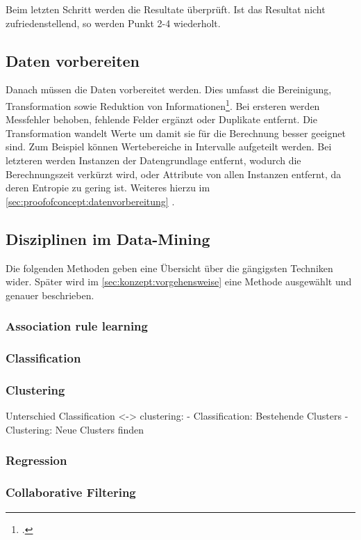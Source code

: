 Beim letzten Schritt werden die Resultate überprüft. Ist das Resultat nicht zufriedenstellend, so werden Punkt 2-4 wiederholt.

\subsection{Daten vorbereiten}
\label{sec:recherche:dataminingtechniken:datenvorbereiten}

Danach müssen die Daten vorbereitet werden. Dies umfasst die Bereinigung, Transformation sowie Reduktion von Informationen\footcite{feature_selection_2017-01-04}. Bei ersteren werden Messfehler behoben, fehlende Felder ergänzt oder Duplikate entfernt. Die Transformation wandelt Werte um damit sie für die Berechnung besser geeignet sind. Zum Beispiel können Wertebereiche in Intervalle aufgeteilt werden. Bei letzteren werden Instanzen der Datengrundlage entfernt, wodurch die Berechnungszeit verkürzt wird, oder Attribute von allen Instanzen entfernt, da deren Entropie zu gering ist. Weiteres hierzu im \cref{sec:proofofconcept:datenvorbereitung} .


\subsection{Disziplinen im Data-Mining}
\label{sec:recherche:dataminingtechniken:disziplinen}
Die folgenden Methoden geben eine Übersicht über die gängigsten Techniken wider. Später wird im \cref{sec:konzept:vorgehensweise}  eine Methode ausgewählt und genauer beschrieben.

\subsubsection{Association rule learning}

\subsubsection{Classification}

\subsubsection{Clustering}
Unterschied Classification <-> clustering: 
- Classification: Bestehende Clusters
- Clustering: Neue Clusters finden

\subsubsection{Regression}

\subsubsection{Collaborative Filtering}